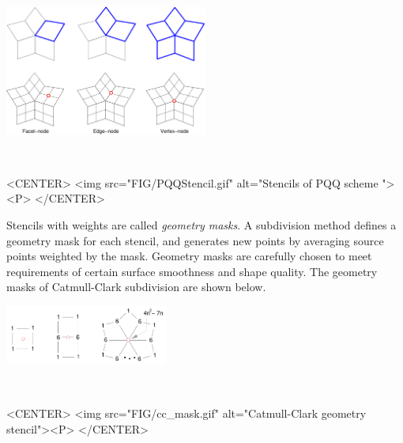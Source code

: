 \begin{ccTexOnly}
  \begin{center}
    \parbox{0.5\textwidth}{%
      \includegraphics[width=0.5\textwidth]{Subdivision_method_3/FIG/PQQStencil}%
    }\\ \vspace{0.5cm}
  \end{center}
\end{ccTexOnly}

\begin{ccHtmlOnly}
  <CENTER>
     <img src="FIG/PQQStencil.gif" alt="Stencils of PQQ scheme "><P>
  </CENTER>
\end{ccHtmlOnly}


Stencils with weights are called \emph{geometry masks}.
A subdivision method defines a geometry mask for each stencil, and 
generates new points by averaging source points weighted by the mask.
Geometry masks are carefully chosen to meet requirements of 
certain surface smoothness and shape quality.
The geometry masks of Catmull-Clark subdivision are shown
below.  

\begin{ccTexOnly}
  \begin{center}
    \parbox{0.4\textwidth}{%
      \includegraphics[width=0.4\textwidth]{Subdivision_method_3/FIG/cc_mask}%
    } \\ \vspace{0.5cm}
  \end{center}
\end{ccTexOnly}

\begin{ccHtmlOnly}
  <CENTER>
     <img src="FIG/cc_mask.gif" alt="Catmull-Clark geometry stencil"><P>
  </CENTER>
\end{ccHtmlOnly}

